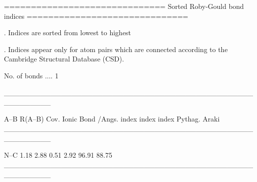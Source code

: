 
==============================
Sorted Roby-Gould bond indices
==============================

. Indices are sorted from lowest to highest

. Indices appear only for atom pairs which are connected
  according to the Cambridge Structural Database (CSD).

No. of bonds .... 1

_________________________________________________________

  A--B    R(A--B)    Cov.   Ionic   Bond    %
           /Angs.   index   index  index  Pythag.   Araki
_________________________________________________________

  N--C       1.18    2.88    0.51   2.92    96.91   88.75
_________________________________________________________
